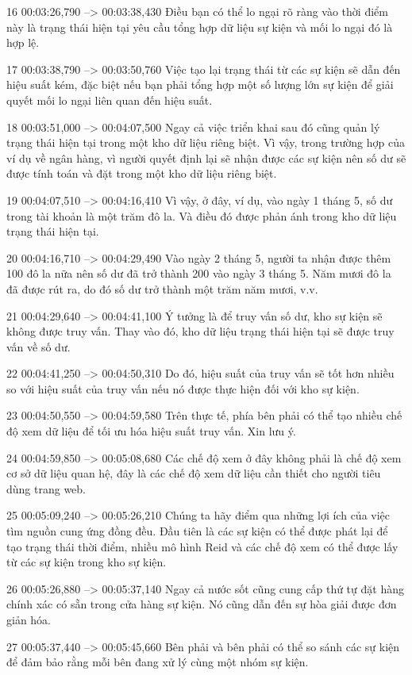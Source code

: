 16
00:03:26,790 --> 00:03:38,430
Điều bạn có thể lo ngại rõ ràng vào thời điểm này là trạng thái hiện tại yêu cầu tổng hợp dữ liệu sự kiện và mối lo ngại đó là hợp lệ.

17
00:03:38,790 --> 00:03:50,760
Việc tạo lại trạng thái từ các sự kiện sẽ dẫn đến hiệu suất kém, đặc biệt nếu bạn phải tổng hợp một số lượng lớn sự kiện để giải quyết mối lo ngại liên quan đến hiệu suất.

18
00:03:51,000 --> 00:04:07,500
Ngay cả việc triển khai sau đó cũng quản lý trạng thái hiện tại trong một kho dữ liệu riêng biệt.  Vì vậy, trong trường hợp của ví dụ về ngân hàng, vì người quyết định lại sẽ nhận được các sự kiện nên số dư sẽ được tính toán và đặt trong một kho dữ liệu riêng biệt.

19
00:04:07,510 --> 00:04:16,410
Vì vậy, ở đây, ví dụ, vào ngày 1 tháng 5, số dư trong tài khoản là một trăm đô la.  Và điều đó được phản ánh trong kho dữ liệu trạng thái hiện tại.

20
00:04:16,710 --> 00:04:29,490
Vào ngày 2 tháng 5, người ta nhận được thêm 100 đô la nữa nên số dư đã trở thành 200 vào ngày 3 tháng 5.  Năm mươi đô la đã được rút ra, do đó số dư trở thành một trăm năm mươi, v.v.

21
00:04:29,640 --> 00:04:41,100
Ý tưởng là để truy vấn số dư, kho sự kiện sẽ không được truy vấn.  Thay vào đó, kho dữ liệu trạng thái hiện tại sẽ được truy vấn về số dư.

22
00:04:41,250 --> 00:04:50,310
Do đó, hiệu suất của truy vấn sẽ tốt hơn nhiều so với hiệu suất của truy vấn nếu nó được thực hiện đối với kho sự kiện.

23
00:04:50,550 --> 00:04:59,580
Trên thực tế, phía bên phải có thể tạo nhiều chế độ xem dữ liệu để tối ưu hóa hiệu suất truy vấn.  Xin lưu ý.

24
00:04:59,850 --> 00:05:08,680
Các chế độ xem ở đây không phải là chế độ xem cơ sở dữ liệu quan hệ, đây là các chế độ xem dữ liệu cần thiết cho người tiêu dùng trang web.

25
00:05:09,240 --> 00:05:26,210
Chúng ta hãy điểm qua những lợi ích của việc tìm nguồn cung ứng đồng đều.  Đầu tiên là các sự kiện có thể được phát lại để tạo trạng thái thời điểm, nhiều mô hình Reid và các chế độ xem có thể được lấy từ các sự kiện trong kho sự kiện.

26
00:05:26,880 --> 00:05:37,140
Ngay cả nước sốt cũng cung cấp thứ tự đặt hàng chính xác có sẵn trong cửa hàng sự kiện.  Nó cũng dẫn đến sự hòa giải được đơn giản hóa.

27
00:05:37,440 --> 00:05:45,660
Bên phải và bên phải có thể so sánh các sự kiện để đảm bảo rằng mỗi bên đang xử lý cùng một nhóm sự kiện.

